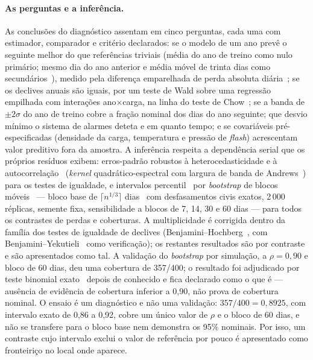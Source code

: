 \paragraph{As perguntas e a inferência.} As conclusões do diagnóstico
assentam em cinco perguntas, cada uma com estimador, comparador e
critério declarados: se o modelo de um ano prevê o seguinte melhor do que
referências triviais (média do ano de treino como nulo primário; mesmo dia
do ano anterior e média móvel de trinta dias como secundários~\cite{HyndmanKoehler2006}), medido
pela diferença emparelhada de perda absoluta diária~\cite{DieboldMariano1995,HarveyLeybourneNewbold1997}; se os declives anuais
são iguais, por um teste de Wald sobre uma regressão empilhada com
interações ano$\times$carga, na linha do teste de Chow~\cite{Chow1960}; se a banda de $\pm2\sigma$ do ano de treino
cobre a fração nominal dos dias do ano seguinte; que desvio mínimo o
sistema de alarmes deteta e em quanto tempo; e se covariáveis
pré-especificadas (densidade da carga, temperatura e pressão de
\emph{flash}) acrescentam valor preditivo fora da
amostra. A inferência
respeita a dependência serial que os próprios resíduos exibem: erros-padrão
robustos à heterocedasticidade e à autocorrelação~\cite{NeweyWest1987}
(\emph{kernel} quadrático-espectral com largura de banda de
Andrews~\cite{Andrews1991}) para os testes de igualdade, e intervalos percentil~\cite{Efron1979,EfronTibshirani1993} por
\emph{bootstrap} de blocos móveis~\cite{Kunsch1989,Lahiri2003} --- bloco
base de $\lceil n^{1/3}\rceil$ dias~\cite{HallHorowitzJing1995} com
desfasamentos civis exatos, 2\,000 réplicas, semente fixa, sensibilidade a blocos de 7, 14,
30 e 60 dias --- para todos os contrastes de perdas e coberturas.  A multiplicidade é corrigida dentro da
família dos testes de igualdade de declives (Benjamini--Hochberg~\cite{BenjaminiHochberg1995}, com
Benjamini--Yekutieli~\cite{BenjaminiYekutieli2001} como verificação); os restantes resultados são por
contraste e são apresentados como tal. A validação do \emph{bootstrap} por
simulação, a $\rho = 0{,}90$ e bloco de 60 dias, deu uma cobertura de
357/400; o resultado foi adjudicado por teste binomial exato~\cite{ClopperPearson1934}
depois de conhecido e fica declarado como o que é --- ausência de evidência de
cobertura inferior a 0,90, não prova de cobertura nominal. O ensaio é um
diagnóstico e não uma validação: $357/400 = 0{,}8925$, com intervalo exato de
0,86 a 0,92, cobre um único valor de $\rho$ e o bloco de 60 dias, e não se
transfere para o bloco base nem demonstra os 95\% nominais. Por isso, um
contraste cujo intervalo exclui o valor de referência por pouco é
apresentado como fronteiriço no local onde aparece.

